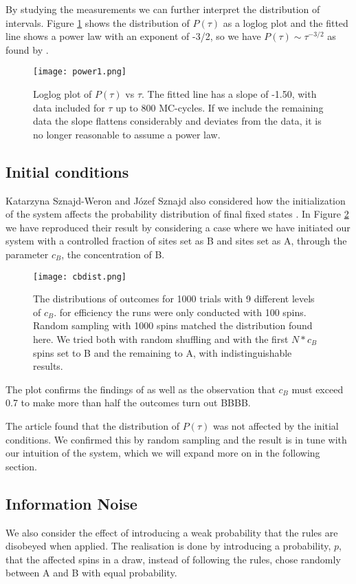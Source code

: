 \documentclass[a4paper]{article}
\begin{document}
By studying the measurements we can further interpret the distribution of intervals. Figure \ref{fig:power} shows the distribution of $P(\tau)$ as a loglog plot and the fitted line shows a power law with an exponent of -3/2, so we have $P(\tau)\sim \tau^{-3/2}$ as found by \cite{opinion}.


\begin{figure}[H]
 \centerline{\texttt{[image: power1.png]}}
 \caption{Loglog plot of $P(\tau)$ vs $\tau$. The fitted line has a slope of -1.50, with data included for $\tau$ up to 800 MC-cycles. If we include the remaining data the slope flattens considerably and deviates from the data, it is no longer reasonable to assume a power law. } 
 \label{fig:power}
\end{figure}


\subsection{Initial conditions}
Katarzyna Sznajd-Weron and Józef Sznajd also considered how the initialization of the system affects the probability distribution of final fixed states \cite{opinion}. In Figure \ref{fig:cb} we have reproduced their result by considering a case where we have initiated our system with a controlled fraction of sites set as B and sites set as A, through the parameter $c_B$, the concentration of B.


\begin{figure}[H]
 \centerline{\texttt{[image: cbdist.png]}}
 \caption{The distributions of outcomes for 1000 trials with 9 different levels of $c_B$. for efficiency the runs were only conducted with 100 spins. Random sampling with 1000 spins matched the distribution found here. We tried both with random shuffling and with the first $N*c_B$ spins set to B and the remaining to A, with indistinguishable results. }
 \label{fig:cb}
\end{figure}

The plot confirms the findings of \cite{opinion} as well as the observation that $c_B$ must exceed 0.7 to make more than half the outcomes turn out BBBB.


The article \cite{opinion} found that the distribution of $P(\tau)$ was not affected by the initial conditions. We confirmed this by random sampling and the result is in tune with our intuition of the system, which we will expand more on in the following section.


\subsection{Information Noise}
We also consider the effect of introducing a weak probability that the rules are disobeyed when applied. The realisation is done by introducing a probability, $p$, that the affected spins in a draw, instead of following the rules, chose randomly between A and B with equal probability. 
\end{document}
